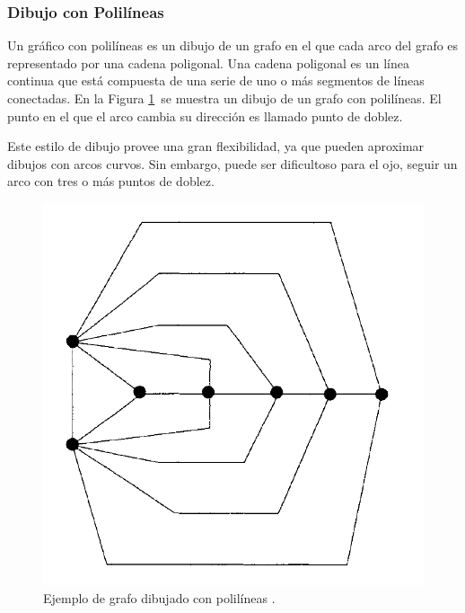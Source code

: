 \subsubsection{Dibujo con Polilíneas}
Un gráfico con  polilíneas \cite{nishizeki2004planar} es  un dibujo de  un grafo en el que cada arco del grafo es representado por  una cadena poligonal. Una cadena poligonal es un línea continua que está compuesta de una serie de uno  o más segmentos  de líneas conectadas. En la Figura \ref{fig:ejemplo_dibujado_polilineas}\
 se  muestra un dibujo de un grafo con polilíneas. El punto en el que el arco  cambia su  dirección es  llamado  punto de doblez.

Este estilo de dibujo provee una gran flexibilidad, ya que pueden   aproximar dibujos con arcos curvos. Sin embargo, puede ser dificultoso para el ojo, seguir un arco con tres  o más puntos de doblez.

\begin{figure}
	\begin{center}
		\includegraphics[scale=0.3]{imagenes/GrafoPolilinea.png}
	\end{center}
	\caption{Ejemplo de grafo dibujado con polilíneas \cite{nishizeki2004planar}.}\label{fig:ejemplo_dibujado_polilineas}
\end{figure}




